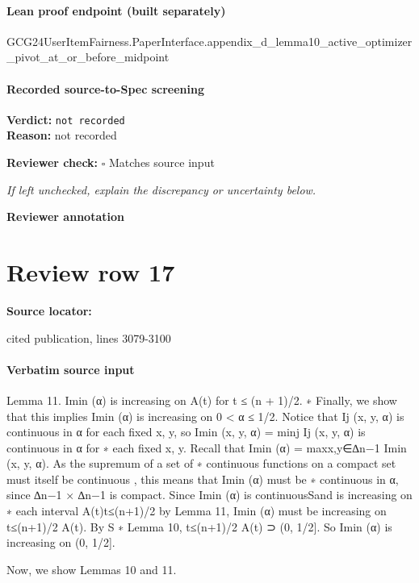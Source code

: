 \documentclass[10pt]{article}
\newcommand{\reviewerbox}{%
  \par\noindent\fbox{\parbox{0.96\linewidth}{\rule{0pt}{0.38in}}}\par
}
\newcommand{\reviewmatch}[1]{%
  \par\noindent\textbf{Reviewer check:} $\square$\; #1\par
  \noindent\emph{If left unchecked, explain the discrepancy or uncertainty below.}\par
}
\begin{document}
\paragraph{Lean proof endpoint (built separately)}\begin{ReviewVerbatim}
GCG24UserItemFairness.PaperInterface.appendix_d_lemma10_active_optimizer_pivot_at_or_before_midpoint
\end{ReviewVerbatim}

\paragraph{Recorded source-to-Spec screening}
\textbf{Verdict:} \texttt{not recorded}
\\
\textbf{Reason:} not recorded
\reviewmatch{Matches source input}
\noindent\textbf{Reviewer annotation}\par
\reviewerbox
\clearpage
\hypertarget{source-claim-9a6a42e2321f37e9}{}
\section*{Review row 17}
\textbf{Source locator:} {\footnotesize\raggedright cited publication, lines 3079-\allowbreak{}3100\par}
\paragraph{Verbatim source input}
\begin{ReviewVerbatim}
Lemma 11. Imin
(α) is increasing on A(t) for t ≤ (n + 1)/2.
∗
Finally, we show that this implies Imin
(α) is increasing on 0 < α ≤ 1/2. Notice that Ij (x, y, α)
is continuous in α for each fixed x, y, so Imin (x, y, α) = minj Ij (x, y, α) is continuous in α for
∗
each fixed x, y. Recall that Imin
(α) = maxx,y∈∆n−1 Imin (x, y, α). As the supremum of a set of
∗
continuous functions on a compact set must itself be continuous , this means that Imin
(α) must be
∗
continuous in α, since ∆n−1 × ∆n−1 is compact. Since Imin (α) is continuousSand is increasing on
∗
each interval {A(t)}t≤(n+1)/2 by Lemma 11, Imin
(α) must be increasing on t≤(n+1)/2 A(t). By
S
∗
Lemma 10, t≤(n+1)/2 A(t) ⊃ (0, 1/2]. So Imin (α) is increasing on (0, 1/2].

Now, we show Lemmas 10 and 11.
\end{ReviewVerbatim}
\end{document}
